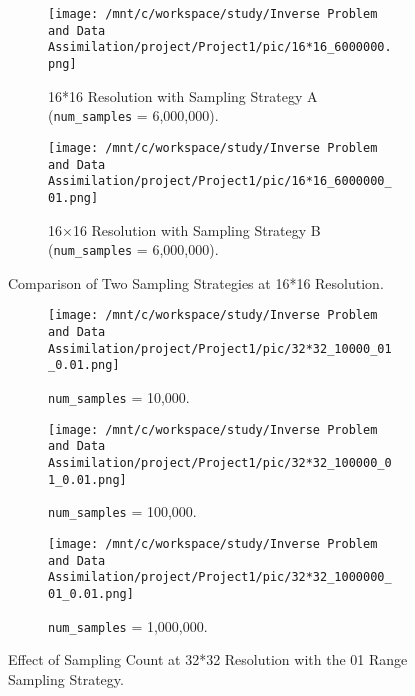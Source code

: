 \documentclass[11pt,reqno]{amsart}
\begin{document}
\begin{figure}[htbp]
    \centering
    \begin{subfigure}[t]{0.45\textwidth}
        \centering
        \texttt{[image: /mnt/c/workspace/study/Inverse Problem and Data Assimilation/project/Project1/pic/16*16\_6000000.png]} %
        \caption{16*16 Resolution with Sampling Strategy A (\texttt{num\_samples} = 6,000,000).}
        \label{fig:16x16-strategy-a}
    \end{subfigure}
    \hfill
    \begin{subfigure}[t]{0.45\textwidth}
        \centering
        \texttt{[image: /mnt/c/workspace/study/Inverse Problem and Data Assimilation/project/Project1/pic/16*16\_6000000\_01.png]} %
        \caption{16×16 Resolution with Sampling Strategy B (\texttt{num\_samples} = 6,000,000).}
        \label{fig:16x16-strategy-b}
    \end{subfigure}
    \caption{Comparison of Two Sampling Strategies at 16*16 Resolution.}
    \label{fig:comparison-16x16}

  \end{figure}
  \begin{figure}[htbp]
    \vspace{0.5cm} %
    \begin{subfigure}[t]{0.33\textwidth}
        \centering
        \texttt{[image: /mnt/c/workspace/study/Inverse Problem and Data Assimilation/project/Project1/pic/32*32\_10000\_01\_0.01.png]} %
        \caption{\texttt{num\_samples} = 10,000.}
        \label{fig:32x32-10k}
    \end{subfigure}
    \hfill
    \begin{subfigure}[t]{0.32\textwidth}
        \centering
        \texttt{[image: /mnt/c/workspace/study/Inverse Problem and Data Assimilation/project/Project1/pic/32*32\_100000\_01\_0.01.png]} %
        \caption{\texttt{num\_samples} = 100,000.}
        \label{fig:32x32-100k}
    \end{subfigure}
    \hfill
    \begin{subfigure}[t]{0.33\textwidth}
        \centering
        \texttt{[image: /mnt/c/workspace/study/Inverse Problem and Data Assimilation/project/Project1/pic/32*32\_1000000\_01\_0.01.png]} %
        \caption{\texttt{num\_samples} = 1,000,000.}
        \label{fig:32x32-1m}
    \end{subfigure}
    \caption{Effect of Sampling Count at 32*32 Resolution with the 01 Range Sampling Strategy.}
    \label{fig:comparison-32x32}
\end{figure}
\end{document}
